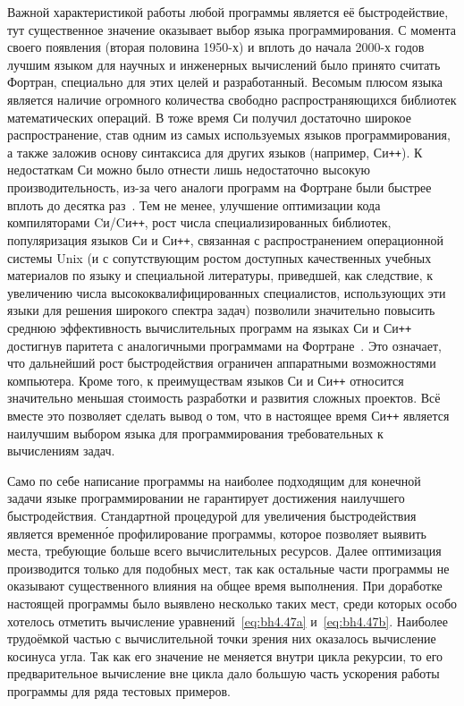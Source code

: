 Важной характеристикой работы любой программы является её
быстродействие, тут существенное значение оказывает выбор языка
программирования.  С момента своего появления (вторая половина 1950-х)
и вплоть до начала 2000-х годов лучшим языком для научных и инженерных
вычислений было принято считать Фортран, специально для этих целей и
разработанный. Весомым плюсом языка является наличие огромного
количества свободно распространяющихся библиотек математических
операций. В тоже время Си получил достаточно широкое распространение,
став одним из самых используемых языков программирования, а также
заложив основу синтаксиса для других языков (например, Си\texttt{++}).
К недостаткам Си можно было отнести лишь недостаточно высокую
производительность, из-за чего аналоги программ на Фортране были
быстрее вплоть до десятка раз~\cite{Veldhuizen-1997}. Тем не менее,
улучшение оптимизации кода компиляторами Cи/Cи\texttt{++}, рост числа
специализированных библиотек, популяризация языков Си и Си\texttt{++},
связанная с распространением операционной системы Unix (и с
сопутствующим ростом доступных качественных учебных материалов по
языку и специальной литературы, приведшей, как следствие, к увеличению
числа высококвалифицированных специалистов, использующих эти языки для
решения широкого спектра задач) позволили значительно повысить среднюю
эффективность вычислительных программ на языках Си и Си\texttt{++}
достигнув паритета с аналогичными программами на
Фортране~\cite{Veldhuizen-1997,Markovich-FDTD-2013}.  Это означает,
что дальнейший рост быстродействия ограничен аппаратными возможностями
компьютера.  Кроме того, к преимуществам языков Си и Си\texttt{++}
относится значительно меньшая стоимость разработки и развития сложных
проектов.  Всё вместе это позволяет сделать вывод о том, что в
настоящее время Си\texttt{++} является наилучшим выбором языка для
программирования требовательных к вычислениям задач.

Само по себе написание программы на наиболее подходящим для конечной
задачи языке программировании не гарантирует достижения наилучшего
быстродействия.  Стандартной процедурой для увеличения быстродействия
является временн\'ое профилирование программы, которое позволяет
выявить места, требующие больше всего вычислительных ресурсов.  Далее
оптимизация производится только для подобных мест, так как остальные
части программы не оказывают существенного влияния на общее время
выполнения.  При доработке настоящей программы было выявлено несколько
таких мест, среди которых особо хотелось отметить вычисление
уравнений~\ref{eq:bh4.47a} и~\ref{eq:bh4.47b}.  Наиболее трудоёмкой
частью с вычислительной точки зрения них оказалось вычисление косинуса
угла. Так как его значение не меняется внутри цикла рекурсии, то его
предварительное вычисление вне цикла дало большую часть ускорения
работы программы для ряда тестовых примеров.


